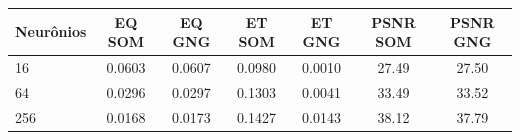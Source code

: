\begin{tabular}{lcccccc}
\toprule
Neurônios & EQ SOM & EQ GNG & ET SOM & ET GNG & PSNR SOM & PSNR GNG\\
\midrule
16 & 0.0603 & 0.0607 & 0.0980 & 0.0010 & 27.49 & 27.50\\
64 & 0.0296 & 0.0297 & 0.1303 & 0.0041 & 33.49 & 33.52\\
256 & 0.0168 & 0.0173 & 0.1427 & 0.0143 & 38.12 & 37.79\\
\bottomrule
\end{tabular}
